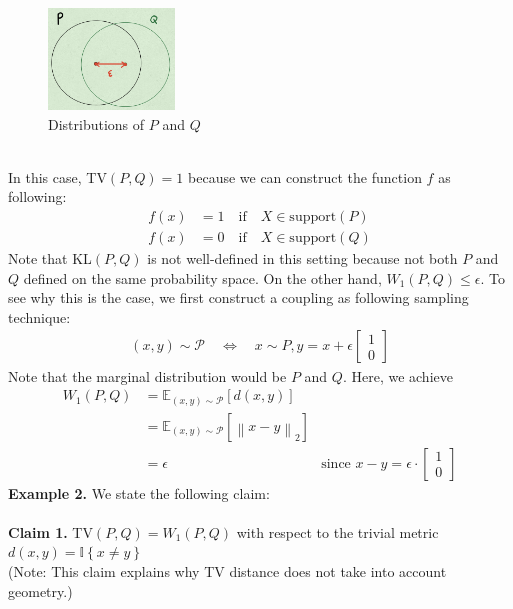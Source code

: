 \documentclass[11pt]{article}
\newcommand\bbE{\ensuremath{\mathbb{E}}} %
\newcommand{\norm}[1]{\left\lVert #1 \right\rVert} %
\newcommand{\1}{\mathbb{I}} %
\begin{document}
    \begin{figure}[h]
  \centering
    \includegraphics[width=0.3\textwidth]{sphere.jpeg}
     \caption{Distributions of $P$ and $Q$}
     \label{fig:sphere}
\end{figure}
\\
\noindent  In this case, TV$(P,Q) = 1$ because we can construct the function $f$ as following:
\begin{align*}
    f(x) &= 1 \quad \text{if} \quad X \in \text{support}(P)\\
    f(x) &= 0 \quad \text{if} \quad X \in \text{support}(Q)
\end{align*}
Note that KL$(P,Q)$ is not well-defined in this setting because not both $P$ and $Q$ defined on the same probability space. On the other hand, $W_1(P,Q) \le \epsilon$. To see why this is the case, we first construct a coupling as following sampling technique:
\begin{align*}
    (x,y) \sim \mathcal{P} \quad \Longleftrightarrow \quad x \sim P, y = x + \epsilon \begin{bmatrix}
    1\\
    0
    \end{bmatrix}
\end{align*}
Note that the marginal distribution would  be $P$ and $Q$. Here, we achieve 
\begin{align*}
    W_1(P,Q) &= \bbE_{(x,y) \sim \mathcal{P}} \left[d(x,y) \right] \\
    &= \bbE_{(x,y) \sim \mathcal{P}} \left[ \norm{x-y}_2 \right] \\
    &= \epsilon  &\text{since } x-y = \epsilon \cdot \begin{bmatrix}
    1 \\
    0
    \end{bmatrix}
\end{align*}
\noindent \textbf{Example 2.} We state the following claim:\\
\\
\textbf{Claim 1.} TV$(P,Q) = W_1(P,Q)$ with respect to the trivial metric $d(x,y) = \1 \left\{ x \neq y \right\}$ \\
(Note: This claim explains why TV distance does not take into account geometry.) \\
\end{document}
